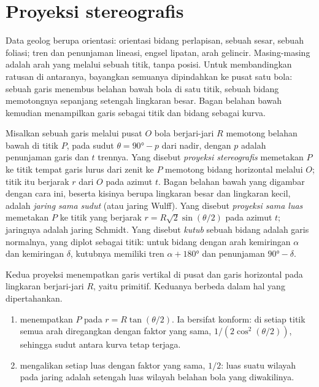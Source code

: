 \section{Proyeksi stereografis}\label{sec:b3:structural-analysis:stereo}

Data geolog berupa orientasi: orientasi bidang perlapisan, sebuah
sesar, sebuah foliasi; tren dan penunjaman lineasi, engsel lipatan, arah
gelincir. Masing-masing adalah arah yang melalui sebuah titik, tanpa posisi. Untuk
membandingkan ratusan di antaranya, bayangkan semuanya dipindahkan ke pusat satu bola:
sebuah garis menembus belahan bawah bola di satu titik, sebuah bidang memotongnya sepanjang
setengah lingkaran besar. Bagan belahan bawah kemudian menampilkan garis sebagai
titik dan bidang sebagai kurva.

\begin{definition}\label{def:b3:structural-analysis:stereo}
Misalkan sebuah garis melalui pusat $O$ bola berjari-jari $R$ memotong belahan bawah
di titik $P$, pada sudut $\theta = \ang{90} - p$ dari nadir, dengan $p$
adalah penunjaman garis dan $t$ trennya. Yang disebut \emph{proyeksi
stereografis} memetakan $P$ ke titik tempat
garis lurus dari zenit ke $P$ memotong bidang horizontal melalui
$O$; titik itu berjarak $r$ dari $O$ pada azimut $t$.
Bagan belahan bawah yang digambar dengan cara ini, beserta kisinya berupa lingkaran besar dan
lingkaran kecil, adalah \emph{jaring sama sudut} (atau
jaring Wulff). Yang disebut \emph{proyeksi sama luas}
memetakan $P$ ke titik yang berjarak $r =
R\sqrt2\sin(\theta/2)$ pada azimut $t$; jaringnya adalah jaring Schmidt.
Yang disebut \emph{kutub} sebuah bidang adalah garis normalnya, yang diplot
sebagai titik: untuk bidang dengan arah kemiringan $\alpha$ dan kemiringan $\delta$, kutubnya
memiliki tren $\alpha + \ang{180}$ dan penunjaman $\ang{90} - \delta$.
\end{definition}

Kedua proyeksi menempatkan garis vertikal di pusat dan garis horizontal pada
lingkaran berjari-jari $R$, yaitu primitif. Keduanya berbeda dalam hal yang dipertahankan.

\begin{theorem}\label{thm:b3:structural-analysis:projections}
\begin{enumerate}[label=(\alph*)]
  \item {} menempatkan $P$ pada $r = R\tan(\theta/2)$. Ia
        bersifat konform: di setiap titik semua arah diregangkan dengan
        faktor yang sama, $1/(2\cos^2(\theta/2))$, sehingga sudut antara
        kurva tetap terjaga.
  \item {} mengalikan setiap luas dengan faktor yang sama,
        $1/2$: luas suatu wilayah pada jaring adalah setengah luas
        wilayah belahan bola yang diwakilinya.
\end{enumerate}
\end{theorem}

